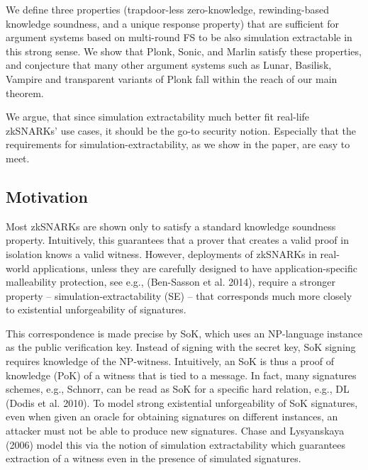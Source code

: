\documentclass[11pt]{llncs}
\begin{document}
We define three properties (trapdoor-less zero-knowledge, rewinding-based knowledge soundness, and a unique response property) that are sufficient for argument systems based on multi-round FS to be also simulation extractable in this strong sense. We show that Plonk, Sonic, and Marlin satisfy these properties, and conjecture that many other argument systems such as Lunar, Basilisk, Vampire and transparent variants of Plonk fall within the reach of our main theorem.

We argue, that since simulation extractability much better fit real-life zkSNARKs' use cases, it should be the go-to security notion. Especially that the requirements for simulation-extractability, as we show in the paper, are easy to meet. 

\subsection{Motivation}
Most zkSNARKs are shown only to satisfy a standard knowledge soundness property.
Intuitively, this guarantees that a prover that creates a valid proof
in isolation knows a valid witness. However, deployments of zkSNARKs in
real-world applications, unless they are carefully designed to have
application-specific malleability protection, see e.g., (Ben-Sasson et al. 2014),
require a stronger property -- simulation-extractability (SE) -- that
corresponds much more closely to existential unforgeability of signatures.

This correspondence is made precise by SoK, which uses an NP-language instance
as the public verification key. Instead of signing with the secret key, SoK
signing requires knowledge of the NP-witness. Intuitively, an SoK is thus a
proof of knowledge (PoK) of a witness that is tied to a message. In fact, many
signatures schemes, e.g., Schnorr, can be read as SoK for a specific hard
relation, e.g., DL (Dodis et al. 2010). To model strong existential unforgeability
of SoK signatures, even when given an oracle for obtaining signatures on
different instances, an attacker must not be able to produce new signatures.
Chase and Lysyanskaya (2006) model this via the notion of simulation
extractability which guarantees extraction of a witness even in the presence of
simulated signatures.
\end{document}
